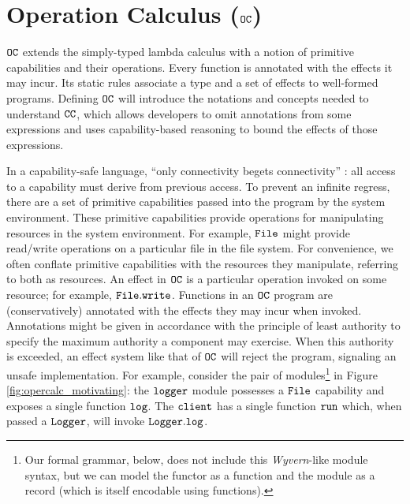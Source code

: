 \section{Operation Calculus ($\mathtt{OC}$)}

$\mathtt{OC}$ extends the simply-typed lambda calculus with a notion of primitive capabilities and their operations.
Every function is annotated with the effects it may incur.
Its static rules associate a type and a set of effects to well-formed programs.
Defining $\mathtt{OC}$ will introduce the notations and concepts needed to understand $\mathtt{CC}$, which allows developers to omit annotations from some expressions and uses capability-based reasoning to bound the effects of those expressions.

In a capability-safe language, ``only connectivity begets connectivity'' \cite{miller06}: all access to a capability must derive from previous access.
To prevent an infinite regress, there are a set of primitive capabilities passed into the program by the system environment.
These primitive capabilities provide operations for manipulating resources in the system environment.
For example, $\mathtt{File}$ might provide read/write operations on a particular file in the file system.
For convenience, we often conflate primitive capabilities with the resources they manipulate, referring to both as resources.
An effect in $\mathtt{OC}$ is a particular operation invoked on some resource; for example, $\mathtt{File.write}$.
Functions in an $\mathtt{OC}$ program are (conservatively) annotated with the effects they may incur when invoked. Annotations might be given in accordance with the principle of least authority to specify the maximum authority a component may exercise.
When this authority is exceeded, an effect system like that of $\mathtt{OC}$ will reject the program, signaling an unsafe implementation.
For example, consider the pair of modules\footnote{Our formal grammar, below, does not include this \textit{Wyvern}-like module syntax, but we can model the  functor as a function and the  module as a record (which is itself encodable using functions).} in Figure \ref{fig:opercalc_motivating}: the $\mathtt{logger}$ module possesses a $\mathtt{File}$ capability and exposes a single function $\mathtt{log}$.
The $\mathtt{client}$ has a single function $\mathtt{run}$ which, when passed a $\mathtt{Logger}$, will invoke $\mathtt{Logger.log}$.

